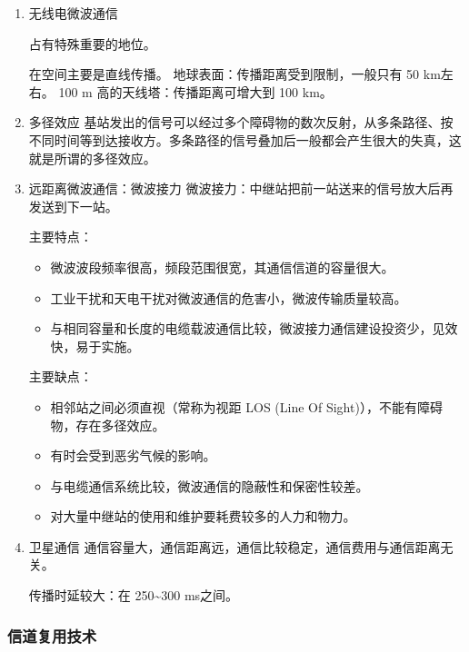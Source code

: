 \documentclass[11pt]{article}
\begin{document}
\begin{enumerate}
\begin{enumerate}
\item 无线电微波通信

占有特殊重要的地位。

在空间主要是直线传播。
地球表面：传播距离受到限制，一般只有 50 km左右。
100 m 高的天线塔：传播距离可增大到 100 km。

\item 多径效应
基站发出的信号可以经过多个障碍物的数次反射，从多条路径、按不同时间等到达接收方。多条路径的信号叠加后一般都会产生很大的失真，这就是所谓的多径效应。

\item 远距离微波通信：微波接力
微波接力：中继站把前一站送来的信号放大后再发送到下一站。

主要特点：
\begin{itemize}
\item 微波波段频率很高，频段范围很宽，其通信信道的容量很大。

\item 工业干扰和天电干扰对微波通信的危害小，微波传输质量较高。

\item 与相同容量和长度的电缆载波通信比较，微波接力通信建设投资少，见效快，易于实施。
\end{itemize}

主要缺点：
\begin{itemize}
\item 相邻站之间必须直视（常称为视距 LOS (Line Of Sight)），不能有障碍物，存在多径效应。

\item 有时会受到恶劣气候的影响。

\item 与电缆通信系统比较，微波通信的隐蔽性和保密性较差。

\item 对大量中继站的使用和维护要耗费较多的人力和物力。
\end{itemize}

\item 卫星通信
通信容量大，通信距离远，通信比较稳定，通信费用与通信距离无关。

传播时延较大：在 250\textasciitilde{}300 ms之间。
\end{enumerate}
\end{enumerate}
\subsubsection{信道复用技术}
\label{sec:org943eec5}
\end{document}
